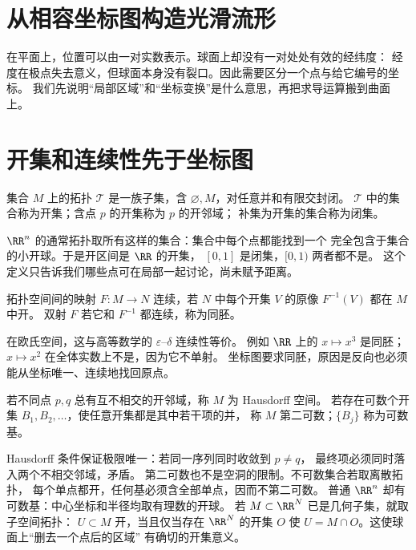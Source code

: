 \section{从相容坐标图构造光滑流形}
在平面上，位置可以由一对实数表示。球面上却没有一对处处有效的经纬度：
经度在极点失去意义，但球面本身没有裂口。因此需要区分一个点与给它编号的坐标。
我们先说明“局部区域”和“坐标变换”是什么意思，再把求导运算搬到曲面上。

\section{开集和连续性先于坐标图}
\label{sec:math-manifold-topology}

\begin{definition}[拓扑、邻域与闭集]
集合 \(M\) 上的拓扑 \(\mathcal T\) 是一族子集，含
\(\varnothing,M\)，对任意并和有限交封闭。
\(\mathcal T\) 中的集合称为开集；含点 \(p\) 的开集称为 \(p\) 的开邻域；
补集为开集的集合称为闭集。
\end{definition}

\(\RR^n\) 的通常拓扑取所有这样的集合：集合中每个点都能找到一个
完全包含于集合的小开球。于是开区间是 \(\RR\) 的开集，
\([0,1]\) 是闭集，\([0,1)\) 两者都不是。
这个定义只告诉我们哪些点可在局部一起讨论，尚未赋予距离。

\begin{definition}[连续映射与同胚]
拓扑空间间的映射 \(F:M\to N\) 连续，若 \(N\) 中每个开集 \(V\)
的原像 \(F^{-1}(V)\) 都在 \(M\) 中开。
双射 \(F\) 若它和 \(F^{-1}\) 都连续，称为同胚。
\end{definition}

在欧氏空间，这与高等数学的 \(\varepsilon\)–\(\delta\) 连续性等价。
例如 \(\RR\) 上的 \(x\mapsto x^3\) 是同胚；
\(x\mapsto x^2\) 在全体实数上不是，因为它不单射。
坐标图要求同胚，原因是反向也必须能从坐标唯一、连续地找回原点。

\begin{definition}[两个分离性条件]
若不同点 \(p,q\) 总有互不相交的开邻域，称 \(M\) 为 Hausdorff 空间。
若存在可数个开集 \(B_1,B_2,\ldots\)，使任意开集都是其中若干项的并，
称 \(M\) 第二可数；\(\{B_j\}\) 称为可数基。
\end{definition}

Hausdorff 条件保证极限唯一：若同一序列同时收敛到 \(p\ne q\)，
最终项必须同时落入两个不相交邻域，矛盾。
第二可数也不是空洞的限制。不可数集合若取离散拓扑，
每个单点都开，任何基必须含全部单点，因而不第二可数。
普通 \(\RR^n\) 却有可数基：中心坐标和半径均取有理数的开球。
若 \(M\subset\RR^N\) 已是几何子集，就取子空间拓扑：
\(U\subset M\) 开，当且仅当存在 \(\RR^N\) 的开集 \(O\)
使 \(U=M\cap O\)。这使球面上“删去一个点后的区域”
有确切的开集意义。

